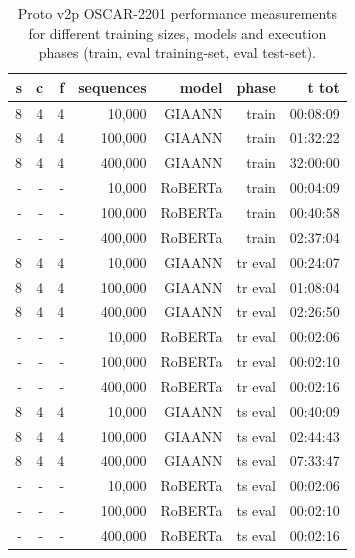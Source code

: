 \begin{table}[H]
\centering
\caption{Proto v2p OSCAR-2201 performance measurements for different training sizes, models and execution phases (train, eval training-set, eval test-set).}
\label{tab:protov2p-oscar-performance-models-inferenceLeakyIntegrateAndFire}
\begin{tabular}{rrrrrrr}
\toprule
\textbf{s} & \textbf{c} & \textbf{f} & \textbf{sequences} & \textbf{model} & \textbf{phase} & \textbf{t tot} \\
\midrule
8 & 4 & 4 & 10,000  & GIAANN  & train   & 00:08:09 \\
8 & 4 & 4 & 100,000 & GIAANN  & train   & 01:32:22 \\
8 & 4 & 4 & 400,000 & GIAANN  & train   & 32:00:00 \\
- & - & - & 10,000  & RoBERTa & train   & 00:04:09 \\
- & - & - & 100,000 & RoBERTa & train   & 00:40:58 \\
- & - & - & 400,000 & RoBERTa & train   & 02:37:04 \\
8 & 4 & 4 & 10,000  & GIAANN  & tr eval & 00:24:07 \\
8 & 4 & 4 & 100,000 & GIAANN  & tr eval & 01:08:04 \\
8 & 4 & 4 & 400,000 & GIAANN  & tr eval & 02:26:50 \\
- & - & - & 10,000  & RoBERTa & tr eval & 00:02:06 \\
- & - & - & 100,000 & RoBERTa & tr eval & 00:02:10 \\
- & - & - & 400,000 & RoBERTa & tr eval & 00:02:16 \\
8 & 4 & 4 & 10,000  & GIAANN  & ts eval & 00:40:09 \\
8 & 4 & 4 & 100,000 & GIAANN  & ts eval & 02:44:43 \\
8 & 4 & 4 & 400,000 & GIAANN  & ts eval & 07:33:47 \\
- & - & - & 10,000  & RoBERTa & ts eval & 00:02:06 \\
- & - & - & 100,000 & RoBERTa & ts eval & 00:02:10 \\
- & - & - & 400,000 & RoBERTa & ts eval & 00:02:16 \\
\bottomrule
\end{tabular}
\end{table}

